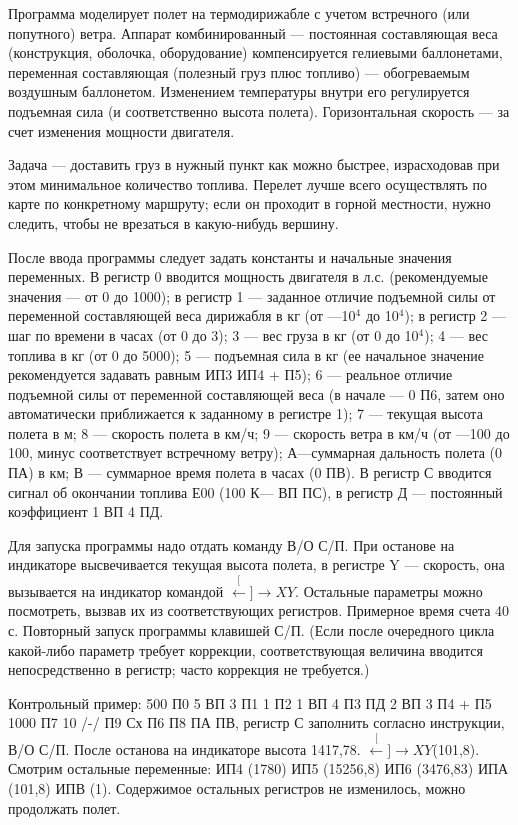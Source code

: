 \documentclass[11pt,a4paper,oneside]{article}
\def\XY{$\stackrel[\leftarrow]{\rightarrow}{XY}$}
\begin{document}
Программа моделирует полет на термодирижабле с учетом встречного (или попутного) ветра. Аппарат комбинированный — постоянная составляющая веса (конструкция, оболочка, оборудование) компенсируется гелиевыми баллонетами, переменная составляющая (полезный груз плюс топливо) — обогреваемым воздушным баллонетом. Изменением температуры внутри его регулируется подъемная сила (и соответственно высота полета). Горизонтальная скорость — за счет изменения мощности двигателя.

Задача — доставить груз в нужный пункт как можно быстрее, израсходовав при этом минимальное количество топлива. Перелет лучше всего осуществлять по карте по конкретному маршруту; если он проходит в горной местности, нужно следить, чтобы не врезаться в какую-нибудь вершину.

После ввода программы следует задать константы и начальные значения переменных. В регистр 0 вводится мощность двигателя в л.с. (рекомендуемые значения — от 0 до 1000); в регистр 1 — заданное отличие подъемной силы от переменной составляющей веса дирижабля в кг (от —10$^{4}$ до 10$^{4}$); в регистр 2 — шаг по времени в часах (от 0 до 3); 3 — вес груза в кг (от 0 до 10$^{4}$); 4 — вес топлива в кг (от 0 до 5000); 5 — подъемная сила в кг (ее начальное значение рекомендуется задавать равным ИП3 ИП4 + П5); 6 — реальное отличие подъемной силы от переменной составляющей веса (в начале — 0 П6, затем оно автоматически приближается к заданному в регистре 1); 7 — текущая высота полета в м; 8 — скорость полета в км/ч; 9 — скорость ветра в км/ч (от —100 до 100, минус соответствует встречному ветру); А—суммарная дальность полета (0 ПА) в км; В — суммарное время полета в часах (0 ПВ). В регистр С вводится сигнал об окончании топлива Е00 (100 К— ВП ПС), в регистр Д — постоянный коэффициент 1 ВП 4 ПД.

Для запуска программы надо отдать команду В/О С/П. При останове на индикаторе высвечивается текущая высота полета, в регистре Y — скорость, она вызывается на индикатор командой \XY. Остальные параметры можно посмотреть, вызвав их из соответствующих регистров. Примерное время счета 40 с. Повторный запуск программы клавишей С/П. (Если после очередного цикла какой-либо параметр требует коррекции, соответствующая величина вводится непосредственно в регистр; часто коррекция не требуется.)

Контрольный пример: 500 П0 5 ВП 3 П1 1 П2 1 ВП 4 П3 ПД 2 ВП 3 П4 + П5 1000 П7 10 /-/ П9 Сх П6 П8 ПА ПВ, регистр С заполнить согласно инструкции, В/О С/П. После останова на индикаторе высота 1417,78. \XY (101,8). Смотрим остальные переменные: ИП4 (1780) ИП5 (15256,8) ИП6 (3476,83) ИПА (101,8) ИПВ (1). Содержимое остальных регистров не изменилось, можно продолжать полет.
\end{document}
